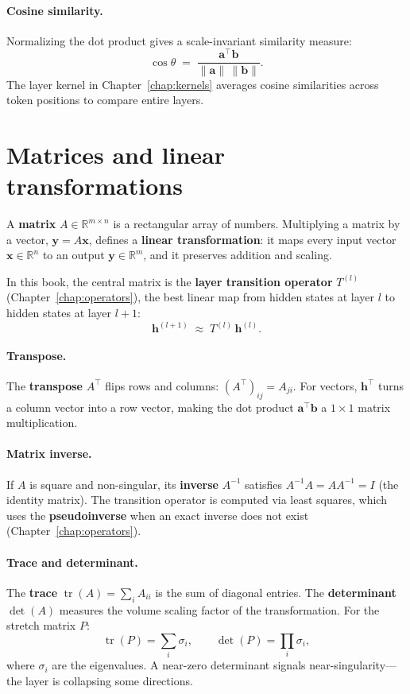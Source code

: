 \documentclass[11pt, twoside, openright]{memoir}
\begin{document}
\paragraph{Cosine similarity.}
Normalizing the dot product gives a scale-invariant similarity measure:
\[
  \cos\theta \;=\;
  \frac{\mathbf{a}^\top \mathbf{b}}{\|\mathbf{a}\|\,\|\mathbf{b}\|}.
\]
The layer kernel in Chapter~\ref{chap:kernels} averages cosine similarities
across token positions to compare entire layers.

\section{Matrices and linear transformations}

A \textbf{matrix} $A \in \mathbb{R}^{m \times n}$ is a rectangular array of
numbers.  Multiplying a matrix by a vector, $\mathbf{y} = A\mathbf{x}$,
defines a \textbf{linear transformation}: it maps every input vector
$\mathbf{x} \in \mathbb{R}^n$ to an output $\mathbf{y} \in \mathbb{R}^m$,
and it preserves addition and scaling.

In this book, the central matrix is the \textbf{layer transition operator}
$T^{(l)}$ (Chapter~\ref{chap:operators}), the best linear map from hidden
states at layer $l$ to hidden states at layer $l+1$:
\[
  \mathbf{h}^{(l+1)} \;\approx\; T^{(l)}\,\mathbf{h}^{(l)}.
\]

\paragraph{Transpose.}
The \textbf{transpose} $A^\top$ flips rows and columns:
$(A^\top)_{ij} = A_{ji}$.  For vectors, $\mathbf{h}^\top$ turns a column
vector into a row vector, making the dot product
$\mathbf{a}^\top\mathbf{b}$ a $1\times 1$ matrix multiplication.

\paragraph{Matrix inverse.}
If $A$ is square and non-singular, its \textbf{inverse} $A^{-1}$ satisfies
$A^{-1}A = AA^{-1} = I$ (the identity matrix).  The transition operator is
computed via least squares, which uses the \textbf{pseudoinverse} when an
exact inverse does not exist (Chapter~\ref{chap:operators}).

\paragraph{Trace and determinant.}
The \textbf{trace} $\operatorname{tr}(A) = \sum_i A_{ii}$ is the sum of
diagonal entries.  The \textbf{determinant} $\det(A)$ measures the volume
scaling factor of the transformation.  For the stretch matrix $P$:
\[
  \operatorname{tr}(P) = \sum_i \sigma_i, \qquad
  \det(P) = \prod_i \sigma_i,
\]
where $\sigma_i$ are the eigenvalues.  A near-zero determinant signals
near-singularity---the layer is collapsing some directions.
\end{document}
